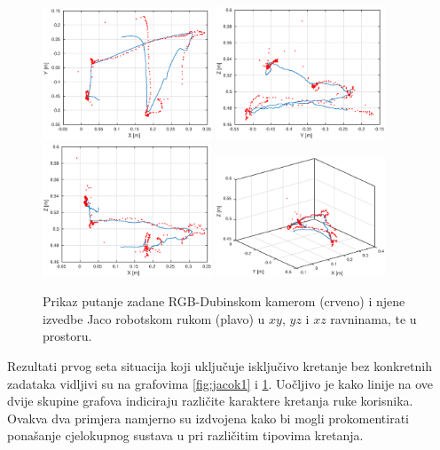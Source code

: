 \documentclass[times, utf8, diplomski, numeric]{fer}
\begin{document}
\begin{figure}[H]
\centering
\includegraphics[width=0.45\textwidth]{jaco_kinect2_xy}
\includegraphics[width=0.45\textwidth]{jaco_kinect2_yz}
\includegraphics[width=0.45\textwidth]{jaco_kinect2_xz}
\includegraphics[width=0.45\textwidth]{jaco_kinect2_xyz}
\caption{Prikaz putanje zadane RGB-Dubinskom kamerom (crveno) i njene izvedbe Jaco robotskom rukom (plavo) u $xy$, $yz$ i $xz$ ravninama, te u prostoru.}
\label{fig:jacok2}
\end{figure}

Rezultati prvog seta situacija koji uključuje isključivo kretanje bez konkretnih zadataka vidljivi su na grafovima \ref{fig:jacok1} i \ref{fig:jacok2}.
Uočljivo je kako linije na ove dvije skupine grafova indiciraju različite karaktere kretanja ruke korisnika. 
Ovakva dva primjera namjerno su izdvojena kako bi mogli prokomentirati ponašanje cjelokupnog sustava u pri različitim tipovima kretanja.
\end{document}
